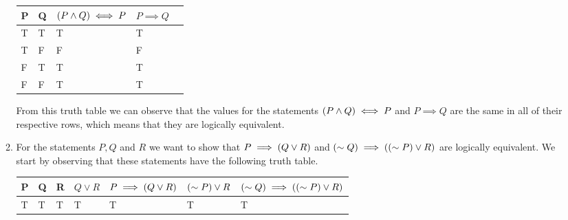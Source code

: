 \documentclass[12pt]{article}
\makeatletter
\newcommand*{\arabicodd}[1]{%
  \expandafter\@arabicodd\csname c@#1\endcsname
}
\newcommand*{\@arabicodd}[1]{%
  \@arabic{\numexpr(#1)*2-1\relax}%
}
\makeatother
\begin{document}
\begin{enumerate}[label=2.\arabicodd*, start=27]
\begin{enumerate}[label=(\alph*)]
                \linebreak
                \begin{minipage}{\linewidth}
                  \small
                  \begin{tabular}{@{}lllll@{}}
                    \toprule
                    P & Q & $\qty(P \land Q) \iff P$ & $P \implies Q$ \\ \midrule
                    T & T & T                        & T              \\
                    T & F & F                        & F              \\
                    F & T & T                        & T              \\
                    F & F & T                        & T              \\
                    \bottomrule
                  \end{tabular}
                \end{minipage}
                \linebreak
                \linebreak
                \linebreak
                \linebreak
                From this truth table we can observe that the values for the
                statements $\qty(P \land Q) \iff P$ and $P \implies Q$
                are the same in all of their respective rows, which means that
                they are logically equivalent.
          \item
                For the statements $P, Q$ and $R$ we want to show that $P \implies \qty(Q \lor R)$
                and $\qty(\sim Q) \implies \qty(\qty(\sim P) \lor R)$ are logically equivalent.
                We start by observing that these statements have the following
                truth table.
                \hfill
                \hfill
                \linebreak
                \linebreak
                \begin{minipage}{\linewidth}
                  \small
                  \begin{tabular}{@{}lllllll@{}}
                    \toprule
                    P & Q & R & $Q \lor R$ & $P \implies \qty(Q \lor R)$ & $\qty(\sim P) \lor R$ & $\qty(\sim Q) \implies \qty(\qty(\sim P) \lor R)$ \\ \midrule
                    T & T & T & T          & T                           & T                     & T                                                 \\

\end{tabular}
\end{minipage}
\end{enumerate}
\end{enumerate}
\end{document}
